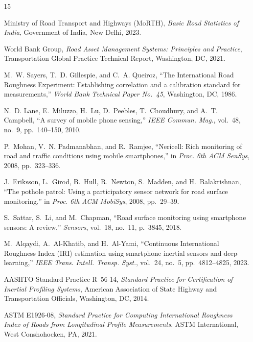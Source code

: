 \documentclass[conference]{IEEEtran}
\begin{document}
\begin{thebibliography}{15}

Ministry of Road Transport and Highways (MoRTH), \emph{Basic Road Statistics of India}, Government of India, New Delhi, 2023.

World Bank Group, \emph{Road Asset Management Systems: Principles and Practice}, Transportation Global Practice Technical Report, Washington, DC, 2021.

M.~W. Sayers, T.~D. Gillespie, and C.~A. Queiroz, ``The International Road Roughness Experiment: Establishing correlation and a calibration standard for measurements,'' \emph{World Bank Technical Paper No.~45}, Washington, DC, 1986.

N.~D. Lane, E.~Miluzzo, H.~Lu, D.~Peebles, T.~Choudhury, and A.~T. Campbell, ``A survey of mobile phone sensing,'' \emph{IEEE Commun. Mag.}, vol.~48, no.~9, pp.~140--150, 2010.

P.~Mohan, V.~N. Padmanabhan, and R.~Ramjee, ``Nericell: Rich monitoring of road and traffic conditions using mobile smartphones,'' in \emph{Proc. 6th ACM SenSys}, 2008, pp.~323--336.

J.~Eriksson, L.~Girod, B.~Hull, R.~Newton, S.~Madden, and H.~Balakrishnan, ``The pothole patrol: Using a participatory sensor network for road surface monitoring,'' in \emph{Proc. 6th ACM MobiSys}, 2008, pp.~29--39.

S.~Sattar, S.~Li, and M.~Chapman, ``Road surface monitoring using smartphone sensors: A review,'' \emph{Sensors}, vol.~18, no.~11, p.~3845, 2018.

M.~Alqaydi, A.~Al-Khatib, and H.~Al-Yami, ``Continuous International Roughness Index (IRI) estimation using smartphone inertial sensors and deep learning,'' \emph{IEEE Trans. Intell. Transp. Syst.}, vol.~24, no.~5, pp.~4812--4825, 2023.

AASHTO Standard Practice R~56-14, \emph{Standard Practice for Certification of Inertial Profiling Systems}, American Association of State Highway and Transportation Officials, Washington, DC, 2014.

ASTM E1926-08, \emph{Standard Practice for Computing International Roughness Index of Roads from Longitudinal Profile Measurements}, ASTM International, West Conshohocken, PA, 2021.


\end{thebibliography}
\end{document}
